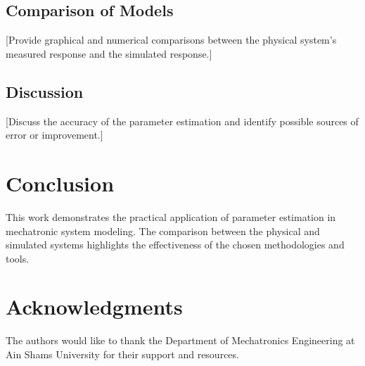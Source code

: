 \documentclass[conference]{IEEEtran}
\begin{document}
\subsection{Comparison of Models}
[Provide graphical and numerical comparisons between the physical system's measured response and the simulated response.]

\subsection{Discussion}
[Discuss the accuracy of the parameter estimation and identify possible sources of error or improvement.]

\section{Conclusion}
This work demonstrates the practical application of parameter estimation in mechatronic system modeling. The comparison between the physical and simulated systems highlights the effectiveness of the chosen methodologies and tools.

\section*{Acknowledgments}
The authors would like to thank the Department of Mechatronics Engineering at Ain Shams University for their support and resources.


\end{document}

